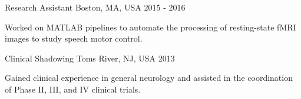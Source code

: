 \begin{cventries}
    \vspace*{0.2cm}

    {Research Assistant}
    {Boston, MA, USA}
    {2015 - 2016}
    {\begin{cvitems}
        \item Worked on MATLAB pipelines to automate the processing of resting-state fMRI images to study speech motor control.
    \end{cvitems}\vspace{1.5\baselineskip}}

    \vspace*{0.2cm}
    
    {Clinical Shadowing}
    {Toms River, NJ, USA}
    {2013}
    {\begin{cvitems}
        \item Gained clinical experience in general neurology and assisted in the coordination of Phase II, III, and IV clinical trials.
    \end{cvitems}\vspace{1.5\baselineskip}}

\end{cventries}
